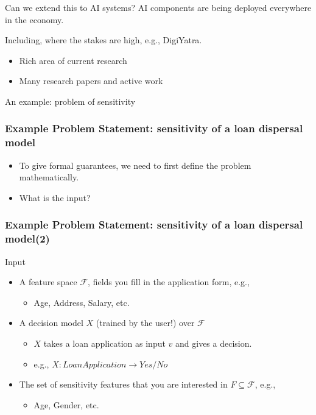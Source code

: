 \documentclass[aspectratio=169]{beamer}
\newcommand{\linegap}{\par\addvspace{3ex}}
\newcommand{\pausegap}{\pause\linegap}
\newcommand{\gemf}[1]{\textcolor{green!50!black}{#1}}
\begin{document}
\begin{frame}{Can we extend this to AI systems?}
  AI components are being deployed everywhere in the economy.
  \pausegap
  Including, where the stakes are high, e.g., DigiYatra.
  \pausegap
  \begin{itemize}
  \item Rich area of current research
  \item Many research papers and active work
  \end{itemize}
  \end{frame}

\begin{frame}
  \begin{center}
    \Huge
    {An example: 
      problem of sensitivity}
  \end{center}
\end{frame}

\begin{frame}
  \frametitle{Example Problem Statement: sensitivity of a loan dispersal model}
  \begin{itemize}
  \item To give formal guarantees, we need to first define the problem mathematically.
  \item What is the input?
  \end{itemize}  
\end{frame}

\begin{frame}
  \frametitle{Example Problem Statement: sensitivity of a loan dispersal model(2)}
  \begin{block}{Input}
    \begin{itemize}
    \item A feature space $\mathcal{F}$, fields you fill in the application form, e.g.,
      \begin{itemize}
      \item Age, Address, Salary, etc.
      \end{itemize}
      \pausegap
    \item A decision model $X$ (trained by the user!) over $\mathcal{F}$
      \begin{itemize}
      \item $X$ takes a loan application as input $v$ and gives a decision.
      \item e.g., $X: Loan Application \rightarrow Yes/No$
      \end{itemize}
      \pausegap
    \item The set of \gemf{sensitivity} features that you are interested in $F\subseteq \mathcal{F}$, e.g.,
      \begin{itemize}
      \item Age, Gender, etc.
      \end{itemize}
    \end{itemize}
  \end{block}
\end{frame}
\end{document}
